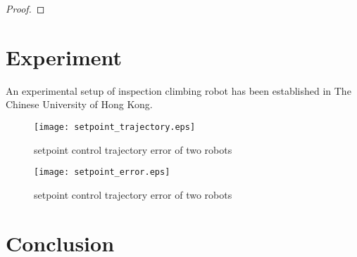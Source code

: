 \documentclass[letterpaper, 10 pt, conference]{ieeeconf}
\begin{document}
\begin{proof}
\end{proof}

\section{Experiment}
An experimental setup of inspection climbing robot has been established in The Chinese University of Hong Kong.
\begin{figure}[!h]
	\centering
	\texttt{[image: setpoint\_trajectory.eps]}\label{sp_tr}
	\caption{setpoint control trajectory error of two robots}
\end{figure}	
\begin{figure}[!h]
	\centering
	\texttt{[image: setpoint\_error.eps]}\label{sp_error}
	\caption{setpoint control trajectory error of two robots}
\end{figure}

\section{Conclusion}
\end{document}
